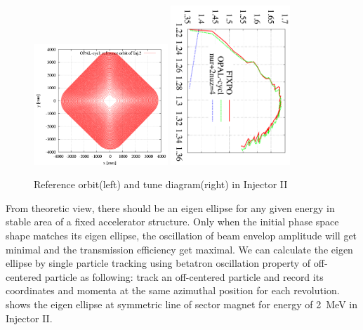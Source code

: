 \begin{figure}[tb]
\centering
   \includegraphics[width=0.45\textwidth]{figures/cyclotron/AEO_Injector2.png}
   \includegraphics[width=0.40\textwidth,angle=90]{figures/cyclotron/nurnuz_Inj2}
   \caption{Reference orbit(left) and tune diagram(right) in Injector II  }
   \label{fig:Inj2 reference orbit and tune}
\end{figure}


From theoretic view, there should be an eigen ellipse for any given energy in stable area of a fixed accelerator structure. Only when the initial phase space
shape matches its eigen ellipse, the oscillation of beam envelop amplitude will get minimal and the transmission efficiency get maximal.
We can calculate the eigen ellipse by single particle tracking using betatron oscillation property of off-centered particle as following: track
an off-centered particle and record its coordinates and momenta at the same azimuthal position for each revolution.
 shows the eigen ellipse at symmetric line of sector magnet for energy of \SI{2}{\mega\electronvolt} in Injector II.

